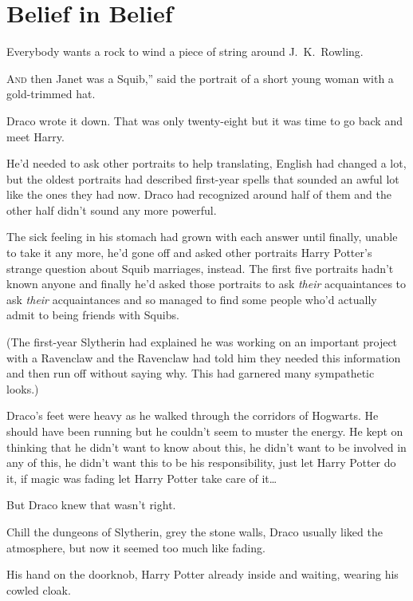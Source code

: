 \chapter{Belief in Belief}

\begin{chapterOpeningAuthorNote}
Everybody wants a rock to wind a piece of string around J.~K.~Rowling.
\end{chapterOpeningAuthorNote}

\lettrine[ante=“]{A}{nd} then Janet was a Squib,” said the portrait of a short young woman with a gold-trimmed hat.

Draco wrote it down. That was only twenty-eight but it was time to go back and meet Harry.

He’d needed to ask other portraits to help translating, English had changed a lot, but the oldest portraits had described first-year spells that sounded an awful lot like the ones they had now. Draco had recognized around half of them and the other half didn’t sound any more powerful.

The sick feeling in his stomach had grown with each answer until finally, unable to take it any more, he’d gone off and asked other portraits Harry Potter’s strange question about Squib marriages, instead. The first five portraits hadn’t known anyone and finally he’d asked those portraits to ask \emph{their} acquaintances to ask \emph{their} acquaintances and so managed to find some people who’d actually admit to being friends with Squibs.

(The first-year Slytherin had explained he was working on an important project with a Ravenclaw and the Ravenclaw had told him they needed this information and then run off without saying why. This had garnered many sympathetic looks.)

Draco’s feet were heavy as he walked through the corridors of Hogwarts. He should have been running but he couldn’t seem to muster the energy. He kept on thinking that he didn’t want to know about this, he didn’t want to be involved in any of this, he didn’t want this to be his responsibility, just let Harry Potter do it, if magic was fading let Harry Potter take care of it…

But Draco knew that wasn’t right.

Chill the dungeons of Slytherin, grey the stone walls, Draco usually liked the atmosphere, but now it seemed too much like fading.

His hand on the doorknob, Harry Potter already inside and waiting, wearing his cowled cloak.

